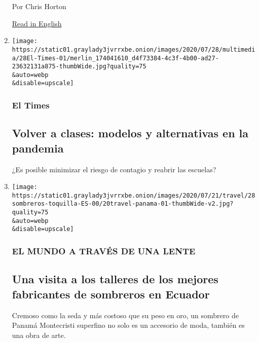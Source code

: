 \begin{enumerate}
  Por Chris Horton

  \href{https://www.nytimes3xbfgragh.onion/2020/07/24/world/asia/taiwan-octogenarian-couple-instagram-laundry.html}{Read
  in English}
\item
  \href{/es/2020/07/28/espanol/regreso-a-clases-covid.html}{}

  \texttt{[image: https://static01.graylady3jvrrxbe.onion/images/2020/07/28/multimedia/28El-Times-01/merlin\_174041610\_d4f73384-4c3f-4b00-ad27-23632131a875-thumbWide.jpg?quality=75\\\&auto=webp\\\&disable=upscale]}

  \hypertarget{el-times}{%
  \subsubsection{El Times}\label{el-times}}

  \hypertarget{volver-a-clases-modelos-y-alternativas-en-la-pandemia}{%
  \subsection{Volver a clases: modelos y alternativas en la
  pandemia}\label{volver-a-clases-modelos-y-alternativas-en-la-pandemia}}

  ¿Es posible minimizar el riesgo de contagio y reabrir las escuelas?
\item
  \href{/es/2020/07/28/espanol/estilos-de-vida/sombreros-toquilla-panama-ecuador.html}{}

  \texttt{[image: https://static01.graylady3jvrrxbe.onion/images/2020/07/21/travel/28sombreros-toquilla-ES-00/20travel-panama-01-thumbWide-v2.jpg?quality=75\\\&auto=webp\\\&disable=upscale]}

  \hypertarget{el-mundo-a-travuxe9s-de-una-lente}{%
  \subsubsection{EL MUNDO A TRAVÉS DE UNA
  LENTE}\label{el-mundo-a-travuxe9s-de-una-lente}}

  \hypertarget{una-visita-a-los-talleres-de-los-mejores-fabricantes-de-sombreros-en-ecuador}{%
  \subsection{Una visita a los talleres de los mejores fabricantes de
  sombreros en
  Ecuador}\label{una-visita-a-los-talleres-de-los-mejores-fabricantes-de-sombreros-en-ecuador}}

  Cremoso como la seda y más costoso que su peso en oro, un sombrero de
  Panamá Montecristi superfino no solo es un accesorio de moda, también
  es una obra de arte.


\end{enumerate}
